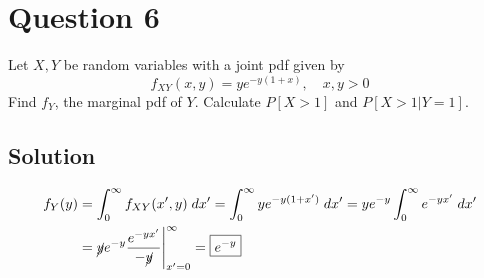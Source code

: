\section*{Question 6}

Let \( X, Y \) be random variables with a joint pdf given by
\[
    f_{XY}(x,y)=ye^{-y(1+x)}, \quad x,y>0
\]
Find \(f_Y\), the marginal pdf of \(Y\).
Calculate \(P [X > 1]\) and \(P[X > 1|Y = 1]\).

\subsection*{Solution}

\begin{align*}
    f_Y(y)
     & =
    \int_{0}^{\infty} f_{XY}(x', y) \; dx'
    =
    \int_{0}^{\infty} ye^{-y(1+x')} \; dx'
    =
    y e^{-y} \int_{0}^{\infty} e^{-yx'} \; dx'
    \\ & =
    \cancel{y} e^{-y} \frac{e^{-yx'}}{-\cancel{y}} \Bigg|_{x'=0}^{\infty}
    =
    \boxed{
        e^{-y}
    }
\end{align*}
